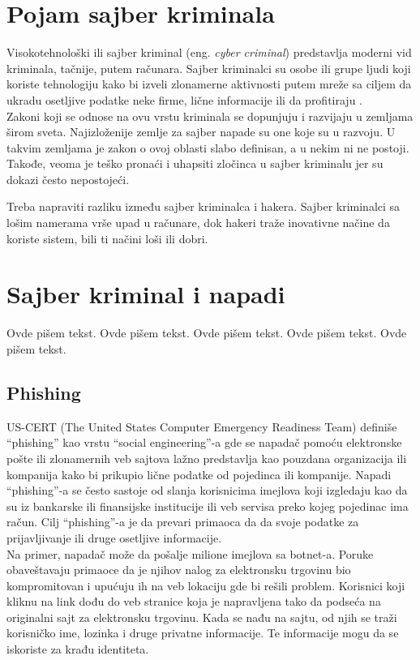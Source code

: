 \documentclass[a4paper]{article}
\begin{document}
\section{Pojam sajber kriminala}
\label{pojam}

Visokotehnološki ili sajber kriminal (eng. {\em cyber criminal}) predstavlja moderni vid kriminala, tačnije, putem računara. Sajber kriminalci su osobe ili grupe ljudi koji koriste tehnologiju kako bi izveli zlonamerne aktivnosti putem mreže sa ciljem da ukradu osetljive podatke neke firme, lične informacije ili da profitiraju \cite{sajber}.
\\Zakoni koji se odnose na ovu vrstu kriminala se dopunjuju i razvijaju u zemljama širom sveta. Najizloženije zemlje za sajber napade su one koje su u razvoju. U takvim zemljama je zakon o ovoj oblasti slabo definisan, a u nekim ni ne postoji. Takođe, veoma je teško pronaći i uhapsiti zločinca u sajber kriminalu jer su dokazi često nepostojeći.

Treba napraviti razliku između sajber kriminalca i hakera. Sajber kriminalci sa lošim namerama vrše upad u računare, dok hakeri traže inovativne načine da koriste sistem, bili ti načini loši ili dobri.
\\

 

\section{Sajber kriminal i napadi}

\label{sec:kriminal_napadi}

Ovde pišem tekst. 
Ovde pišem tekst. 
Ovde pišem tekst. 
Ovde pišem tekst. 
Ovde pišem tekst. 

\subsection{Phishing}
\label{subsec:phishing}

US-CERT (The United States Computer Emergency Readiness Team) definiše “phishing” kao vrstu “social engineering”-a gde se napadač pomoću elektronske pošte ili zlonamernih veb sajtova lažno predstavlja kao pouzdana organizacija ili kompanija kako bi prikupio lične podatke od pojedinca ili kompanije. Napadi “phishing”-a se često sastoje od slanja korisnicima imejlova koji izgledaju kao da su iz bankarske ili finansijske institucije ili veb servisa preko kojeg pojedinac ima račun. Cilj “phishing”-a je da prevari primaoca da da svoje podatke za prijavljivanje ili druge osetljive informacije. 
\\Na primer, napadač može da pošalje milione imejlova sa botnet-a. Poruke obaveštavaju primaoce da je njihov nalog za elektronsku trgovinu bio kompromitovan i upućuju ih na veb lokaciju gde bi rešili problem. Korisnici koji kliknu na link dođu do veb stranice koja je napravljena tako da podseća na originalni sajt za elektronsku trgovinu. Kada se nađu na sajtu, od njih se traži korisničko ime, lozinka i druge privatne informacije. Te informacije mogu da se iskoriste za krađu identiteta.
\end{document}
